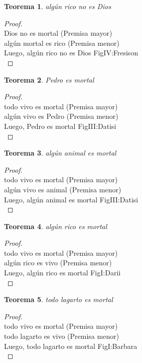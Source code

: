 ﻿\documentclass[12pt]{book}
\newtheorem{theorem}{Teorema}[chapter]
\newtheorem{proof}{Demostración}
\begin{document}
\begin{theorem}
algún rico no es Dios
\label{th: 112}
\end{theorem}\begin{proof}\\Dios no es mortal	 (Premisa mayor) \\algún mortal es rico	 (Premisa menor) \\Luego, algún rico no es Dios	FigIV:Fresison \\ \end{proof}
\begin{theorem}
Pedro es mortal
\label{th: 113}
\end{theorem}\begin{proof}\\todo vivo es mortal	 (Premisa mayor) \\algún vivo es Pedro	 (Premisa menor) \\Luego, Pedro es mortal	FigIII:Datisi \\ \end{proof}
\begin{theorem}
algún animal es mortal
\label{th: 114}
\end{theorem}\begin{proof}\\todo vivo es mortal	 (Premisa mayor) \\algún vivo es animal	 (Premisa menor) \\Luego, algún animal es mortal	FigIII:Datisi \\ \end{proof}
\begin{theorem}
algún rico es mortal
\label{th: 115}
\end{theorem}\begin{proof}\\todo vivo es mortal	 (Premisa mayor) \\algún rico es vivo	 (Premisa menor) \\Luego, algún rico es mortal	FigI:Darii \\ \end{proof}
\begin{theorem}
todo lagarto es mortal
\label{th: 116}
\end{theorem}\begin{proof}\\todo vivo es mortal	 (Premisa mayor) \\todo lagarto es vivo	 (Premisa menor) \\Luego, todo lagarto es mortal	FigI:Barbara \\ \end{proof}
\end{document}
